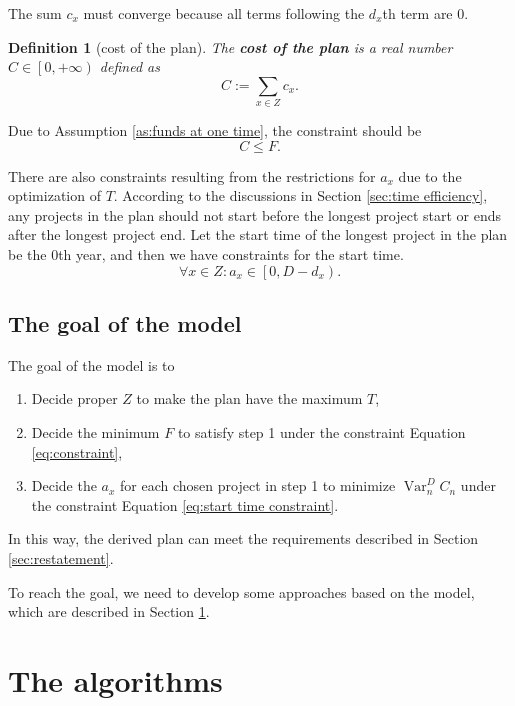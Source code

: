 \documentclass{article}
\DeclareMathOperator*{\var}{Var}
\newtheorem{definition}{Definition}
\begin{document}
The sum $c_x$ must converge because all terms following the $d_x$th term are $0$.

\begin{definition}[cost of the plan]
The \textbf{cost of the plan} is a real number $C\in\left[0,+\infty\right)$ defined as
\begin{equation}
C:=\sum_{x\in Z}c_x.
\end{equation}
\end{definition}

Due to Assumption \ref{as:funds at one time}, the constraint should be
\begin{equation}
\label{eq:constraint}
C\le F.
\end{equation}

There are also constraints resulting from the restrictions for $a_x$ due to the optimization of $T$.
According to the discussions in Section \ref{sec:time efficiency}, any projects in the plan should not start before the longest project start or ends after the longest project end.
Let the start time of the longest project in the plan be the $0$th year, and then we have constraints for the start time.
\begin{equation}
\label{eq:start time constraint}
\forall x\in Z:a_x\in\left[0,D-d_x\right).
\end{equation}

\subsection{The goal of the model}
\label{sec:goal}

The goal of the model is to
\begin{enumerate}
\item Decide proper $Z$ to make the plan have the maximum $T$,
\item Decide the minimum $F$ to satisfy step 1 under the constraint Equation \ref{eq:constraint},
\item Decide the $a_x$ for each chosen project in step 1 to minimize $\var_n^DC_n$ under the constraint Equation \ref{eq:start time constraint}.
\end{enumerate}

In this way, the derived plan can meet the requirements described in Section \ref{sec:restatement}.

To reach the goal, we need to develop some approaches based on the model,
which are described in Section \ref{sec:approach}.

\section{The algorithms}
\label{sec:approach}
\end{document}

